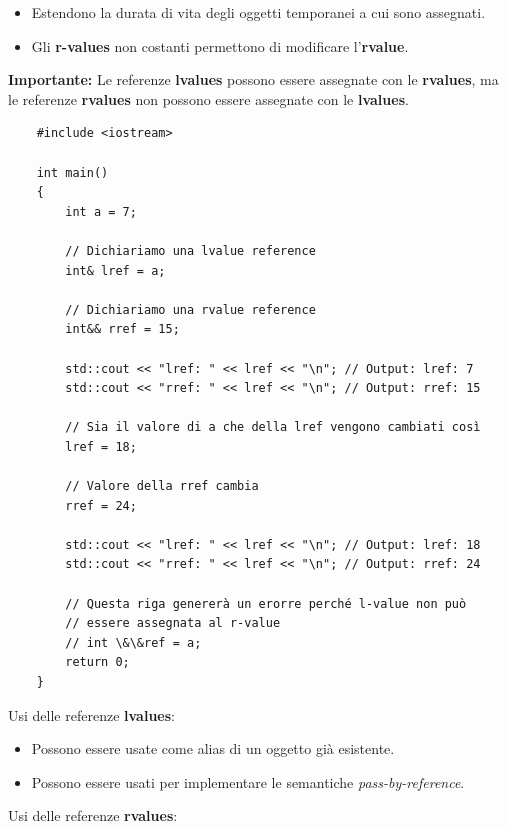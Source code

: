 \begin{itemize}
	\item \textsf{\small Estendono la durata di vita degli oggetti temporanei a cui sono assegnati.}
	\item \textsf{\small Gli \textbf{r-values} non costanti permettono di modificare l'\textbf{rvalue}.}
\end{itemize}

\textsf{\small \textbf{Importante: } Le referenze \textbf{lvalues} possono essere assegnate con le \textbf{rvalues}, ma le referenze \textbf{rvalues} non possono essere assegnate con le \textbf{lvalues}.} \\

\begin{lstlisting}
	#include <iostream>
	
	int main()
	{
		int a = 7;
		
		// Dichiariamo una lvalue reference
		int& lref = a;
		
		// Dichiariamo una rvalue reference
		int&& rref = 15;
		
		std::cout << "lref: " << lref << "\n"; // Output: lref: 7
		std::cout << "rref: " << lref << "\n"; // Output: rref: 15
		
		// Sia il valore di a che della lref vengono cambiati così
		lref = 18;
		
		// Valore della rref cambia
		rref = 24;
		
		std::cout << "lref: " << lref << "\n"; // Output: lref: 18
		std::cout << "rref: " << lref << "\n"; // Output: rref: 24
		
		// Questa riga genererà un erorre perché l-value non può
		// essere assegnata al r-value 
		// int \&\&ref = a;
		return 0;
	}
\end{lstlisting}

\textsf{\small Usi delle referenze \textbf{lvalues}: } \\

\begin{itemize}
	\item \textsf{\small Possono essere usate come alias di un oggetto già esistente.}
	\item \textsf{\small Possono essere usati per implementare le semantiche \emph{pass-by-reference}.}
\end{itemize}

\textsf{\small Usi delle referenze \textbf{rvalues}: } \\

